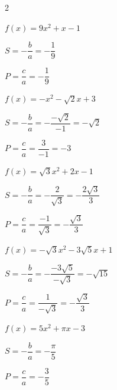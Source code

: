 \documentclass[11pt,a4paper]{article}  %
\begin{document}
\begin{multicols}{2}
\begin{enumMet}
\begin{corrBox}
	\end{corrBox}
	\item $f(x)=9 x^2+x-1$
	\begin{corrBox}
		\begin{itemMet}
			\item \( S = -\dfrac{b}{a} = -\dfrac{1}{9} \)
			\item \( P = \dfrac{c}{a} = -\dfrac{1}{9} \)
		\end{itemMet}
	\end{corrBox}
	\item $f(x)=-x^2-\sqrt{2} x+3$
	\begin{corrBox}
		\begin{itemMet}
			\item \( S = -\dfrac{b}{a} = -\dfrac{-\sqrt{2}}{-1}=-\sqrt{2} \)
			\item \( P = \dfrac{c}{a} = \dfrac{3}{-1}=-3 \)
		\end{itemMet}
	\end{corrBox}
	\item $f(x)=\sqrt{3} x^2+2 x-1$
	\begin{corrBox}
		\begin{itemMet}
			\item \( S = -\dfrac{b}{a} = -\dfrac{2}{\sqrt{3}}=-\dfrac{2\sqrt{3}}{3} \)
			\item \( P = \dfrac{c}{a} = \dfrac{-1}{\sqrt{3}}=-\dfrac{\sqrt{3}}{3} \)
		\end{itemMet}
	\end{corrBox}
	\item $f(x)=-\sqrt{3} x^2-3 \sqrt{5} x+1$
	\begin{corrBox}
		\begin{itemMet}
			\item \( S = -\dfrac{b}{a} = -\dfrac{-3 \sqrt{5}}{-\sqrt{3}}=-\sqrt{15} \)
			\item \( P = \dfrac{c}{a} = \dfrac{1}{-\sqrt{3}}=-\dfrac{\sqrt{3}}{3} \)
		\end{itemMet}
	\end{corrBox}
	\item $f(x)=5 x^2+\pi x-3$
	\begin{corrBox}
		\begin{itemMet}
			\item \( S = -\dfrac{b}{a} = -\dfrac{\pi}{5} \)
			\item \( P = \dfrac{c}{a} = -\dfrac{3}{5} \)
		\end{itemMet}
	\end{corrBox}
\end{enumMet}
\end{multicols}
\end{document}
